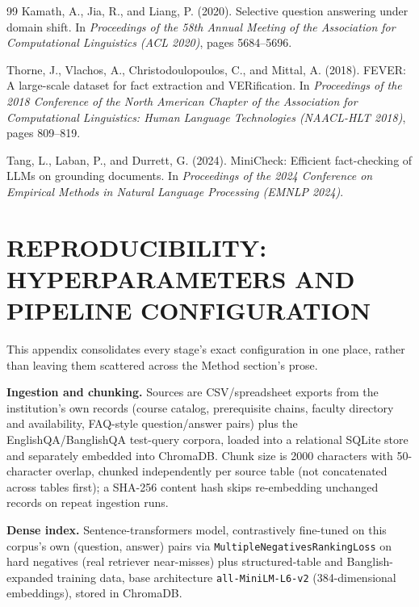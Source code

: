 \documentclass[a4paper,twoside]{article}
\begin{document}
{\begin{thebibliography}{99}
 Kamath, A., Jia, R., and Liang, P. (2020). Selective question answering under domain shift. In \textit{Proceedings of the 58th Annual Meeting of the Association for Computational Linguistics (ACL 2020)}, pages 5684--5696.

 Thorne, J., Vlachos, A., Christodoulopoulos, C., and Mittal, A. (2018). FEVER: A large-scale dataset for fact extraction and VERification. In \textit{Proceedings of the 2018 Conference of the North American Chapter of the Association for Computational Linguistics: Human Language Technologies (NAACL-HLT 2018)}, pages 809--819.

 Tang, L., Laban, P., and Durrett, G. (2024). MiniCheck: Efficient fact-checking of LLMs on grounding documents. In \textit{Proceedings of the 2024 Conference on Empirical Methods in Natural Language Processing (EMNLP 2024)}.

\end{thebibliography}
}

\appendix
\section{\uppercase{Reproducibility: Hyperparameters and Pipeline Configuration}}
\label{sec:appendix-repro}

This appendix consolidates every stage's exact configuration in one place, rather than leaving them scattered across the Method section's prose.

\textbf{Ingestion and chunking.} Sources are CSV/spreadsheet exports from the institution's own records (course catalog, prerequisite chains, faculty directory and availability, FAQ-style question/answer pairs) plus the EnglishQA/BanglishQA test-query corpora, loaded into a relational SQLite store and separately embedded into ChromaDB. Chunk size is 2000 characters with 50-character overlap, chunked independently per source table (not concatenated across tables first); a SHA-256 content hash skips re-embedding unchanged records on repeat ingestion runs.

\textbf{Dense index.} Sentence-transformers model, contrastively fine-tuned on this corpus's own (question, answer) pairs via \texttt{MultipleNegativesRankingLoss} on hard negatives (real retriever near-misses) plus structured-table and Banglish-expanded training data, base architecture \texttt{all-MiniLM-L6-v2} (384-dimensional embeddings), stored in ChromaDB.
\end{document}
